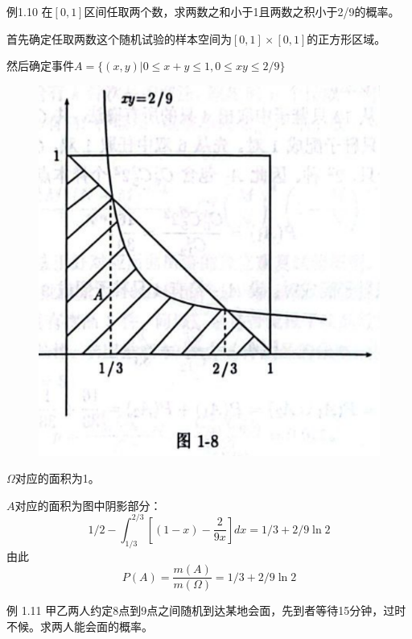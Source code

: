\documentclass{beamer}
\begin{document}
	\begin{frame}
		例1.10 在$[0, 1]$区间任取两个数，求两数之和小于1且两数之积小于2/9的概率。
		
		首先确定任取两数这个随机试验的样本空间为$[0, 1] \times [0, 1]$的正方形区域。
		
		然后确定事件$A = \{(x, y) | 0 \leq x + y \leq 1, 0 \leq xy \leq 2 / 9\}$
	\end{frame}
	
	\begin{frame}
		\begin{figure}[H]
			\centering
			\includegraphics[scale = 0.4]{figures/figure1-8.png}
		\end{figure}
	\end{frame}
	
	\begin{frame}
		$\Omega$对应的面积为1。
		
		$A$对应的面积为图中阴影部分：
		\[
		1 / 2 - \int_{1 / 3}^{2 / 3}[(1 - x) - \frac{2}{9x}]dx = 1 / 3 + 2 / 9 \ln 2
		\]
		由此
		\[
		P(A) = \frac{m(A)}{m(\Omega)} = 1 / 3 + 2 / 9 \ln 2
		\]
	\end{frame}
	
	\begin{frame}
		例 1.11 甲乙两人约定8点到9点之间随机到达某地会面，先到者等待15分钟，过时不候。求两人能会面的概率。
		
	\end{frame}
	
\end{document}
